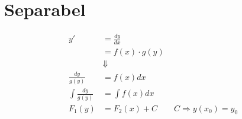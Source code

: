 \section{Separabel}
\begin{align*}[box=\widebox]
y' &= \frac{d y}{d x} \\
&= f(x)\cdot g(y)\\
&\Downarrow\\
\frac{d y}{g(y)} &= f(x)d x\\
\int{\frac{d y}{g(y)}} &= \int{f(x)d x}\\
F_{1}(y) &= F_{2}(x)+C \qquad C\Rightarrow y(x_{0}) = y_{0}
\end{align*}